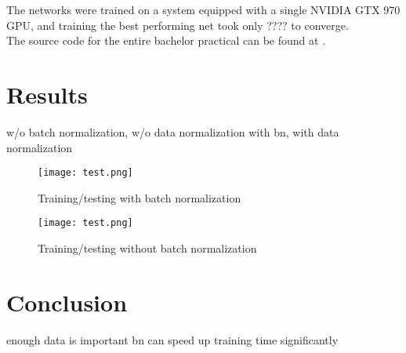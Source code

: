 \documentclass[a4paper, 11pt]{article}
\begin{document}
The networks were trained on a system equipped with a single NVIDIA GTX 970 GPU, and training the best performing net took only ???? to converge.\\

The source code for the entire bachelor practical can be found at \cite{UnternaehrerCode}.

\section{Results}
w/o batch normalization, w/o data normalization
with bn, with data normalization

\begin{figure}[!h]
	\texttt{[image: test.png]}
	\caption{Training/testing with batch normalization}
	\label{fig:bn}
\end{figure}

\begin{figure}[!h]
	\texttt{[image: test.png]}
	\caption{Training/testing without batch normalization}
	\label{fig:no_bn}
\end{figure}

\section{Conclusion}
enough data is important
bn can speed up training time significantly


\clearpage

\end{document}
